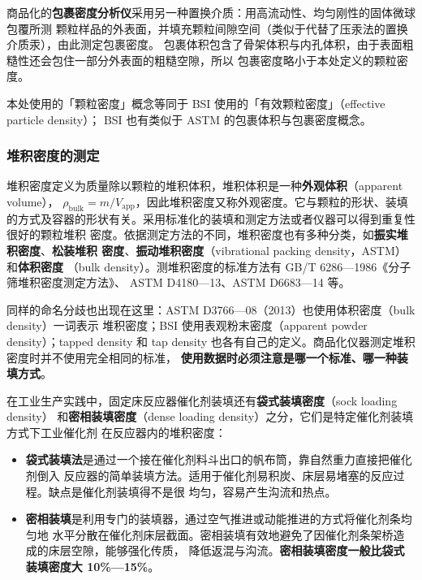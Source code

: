 商品化的\textbf{包裹密度分析仪}采用另一种置换介质：用高流动性、均匀刚性的固体微球包覆所测
颗粒样品的外表面，并填充颗粒间隙空间（类似于代替了压汞法的置换介质汞），由此测定包裹密度。
包裹体积包含了骨架体积与内孔体积，由于表面粗糙性还会包住一部分外表面的粗糙空隙，所以
包裹密度略小于本处定义的颗粒密度。

本处使用的「颗粒密度」概念等同于 BSI 使用的「有效颗粒密度」（effective particle density）；
BSI 也有类似于 ASTM 的包裹体积与包裹密度概念。

\subsubsection{堆积密度的测定}

堆积密度定义为质量除以颗粒的堆积体积，堆积体积是一种\textbf{外观体积}（apparent volume），
$\rho_{\mathrm{bulk}}=m/V_{\mathrm{app}}$，因此堆积密度又称外观密度。它与颗粒的形状、装填
的方式及容器的形状有关。采用标准化的装填和测定方法或者仪器可以得到重复性很好的颗粒堆积
密度。依据测定方法的不同，堆积密度也有多种分类，如\textbf{振实堆积密度}、\textbf{松装堆积
密度}、\textbf{振动堆积密度}（vibrational packing density，ASTM）和\textbf{体积密度}
（bulk density）。测堆积密度的标准方法有 GB/T 6286—1986《分子筛堆积密度测定方法》、
ASTM D4180—13、ASTM D6683—14 等。

同样的命名分歧也出现在这里：ASTM D3766—08（2013）也使用体积密度（bulk density）一词表示
堆积密度；BSI 使用表观粉末密度（apparent powder density）；tapped density 和
tap density 也各有自己的定义。商品化仪器测定堆积密度时并不使用完全相同的标准，
\textbf{使用数据时必须注意是哪一个标准、哪一种装填方式}。

在工业生产实践中，固定床反应器催化剂装填还有\textbf{袋式装填密度}（sock loading density）
和\textbf{密相装填密度}（dense loading density）之分，它们是特定催化剂装填方式下工业催化剂
在反应器内的堆积密度：

\begin{itemize}
\item \textbf{袋式装填法}是通过一个接在催化剂料斗出口的帆布筒，靠自然重力直接把催化剂倒入
反应器的简单装填方法。适用于催化剂易积炭、床层易堵塞的反应过程。缺点是催化剂装填得不是很
均匀，容易产生沟流和热点。
\item \textbf{密相装填}是利用专门的装填器，通过空气推进或动能推进的方式将催化剂条均匀地
水平分散在催化剂床层截面。密相装填有效地避免了因催化剂条架桥造成的床层空隙，能够强化传质，
降低返混与沟流。\textbf{密相装填密度一般比袋式装填密度大 10\%—15\%}。
\end{itemize}


